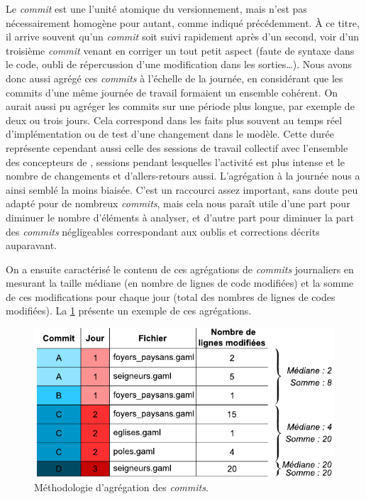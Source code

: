 Le \textit{commit} est une l'unité \og atomique\fg{} du versionnement, mais n'est pas nécessairement homogène pour autant, comme indiqué précédemment.
À ce titre, il arrive souvent qu'un \textit{commit} soit suivi rapidement après d'un second, voir d'un troisième \textit{commit} venant en corriger un tout petit aspect (faute de syntaxe dans le code, oubli de répercussion d'une modification dans les sorties\ldots).
Nous avons donc aussi agrégé ces \textit{commits} à l'échelle de la journée, en considérant que les commits d'une même journée de travail formaient un ensemble cohérent.
On aurait aussi pu agréger les commits sur une période plus longue, par exemple de deux ou trois jours.
Cela correspond dans les faits plus souvent au temps réel d'implémentation ou de test d'une changement dans le modèle.
Cette durée représente cependant aussi celle des sessions de travail collectif avec l'ensemble des concepteurs de \simfeodal{}, sessions pendant lesquelles l'activité est plus intense et le nombre de changements et d'allers-retours aussi.
L'agrégation à la journée nous a ainsi semblé la moins biaisée.
C'est un raccourci assez important, sans doute peu adapté pour de nombreux \textit{commits}, mais cela nous paraît utile d'une part pour diminuer le nombre d'éléments à analyser, et d'autre part pour diminuer la part des \textit{commits} négligeables correspondant aux oublis et corrections décrits auparavant.

On a ensuite caractérisé le contenu de ces agrégations de \textit{commits} journaliers en mesurant la taille médiane (en nombre de lignes de code modifiées) et la somme de ces modifications pour chaque jour (total des nombres de lignes de codes modifiées).
La \cref{fig:methodo-agreg-commits} présente un exemple de ces agrégations.

\begin{figure}[H]
	\centering
	\includegraphics[width=.7\linewidth]{img/tableau_exemple_commits.pdf}
	\caption[Méthodologie d'agrégation des \textit{commits}.]{Méthodologie d'agrégation des \textit{commits}.}
	\label{fig:methodo-agreg-commits}
\end{figure}


